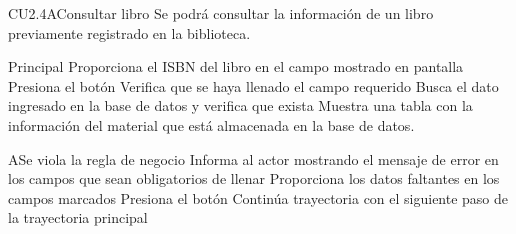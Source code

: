 \begin{UseCase}{CU2.4A}{Consultar libro}{
	Se podrá consultar la información de un libro previamente registrado en la biblioteca.
}
\end{UseCase}


\begin{UCtrayectoria}{Principal}
		\UCpaso[\UCactor] Proporciona el ISBN del libro en el campo mostrado en pantalla 
		\UCpaso[\UCactor] Presiona el botón 
		\UCpaso[\UCsist] Verifica que se haya llenado el campo requerido 
		\UCpaso[\UCsist] Busca el dato ingresado en la base de datos  y verifica que exista 
		\UCpaso[\UCsist] Muestra una tabla con la información del material que está almacenada en la base de datos.
\end{UCtrayectoria}



\begin{UCtrayectoriaA}{A}{Se viola la regla de negocio }	
			\UCpaso[\UCsist] Informa al actor mostrando el mensaje de error  en los campos que sean obligatorios de llenar
			\UCpaso[\UCactor] Proporciona los datos faltantes en los campos marcados 
			\UCpaso[\UCactor] Presiona el botón 
			\UCpaso[\UCsist] Continúa trayectoria con el siguiente paso de la trayectoria principal 
\end{UCtrayectoriaA}

